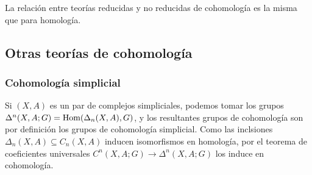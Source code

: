 \documentclass[TA.tex]{subfiles}
\begin{document}
La relación entre teorías reducidas y no reducidas de cohomología es la misma que para homología.


\subsection{Otras teorías de cohomología}
\subsubsection{Cohomología simplicial}
Si $(X,A)$ es un par de complejos simpliciales, podemos tomar los grupos $\Delta^n(X,A;G)=\operatorname{Hom}(\Delta_n(X,A),G)$, y los resultantes grupos de cohomología son por definición los grupos de cohomología simplicial. Como las inclsiones $\Delta_n(X,A)\subseteq C_n(X,A)$ inducen isomorfismos en homología, por el teorema de coeficientes universales $C^n(X,A;G)\to \Delta^n(X,A;G)$ los induce en cohomología.
\end{document}
